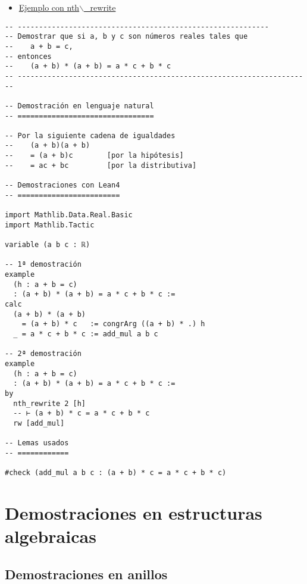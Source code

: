 \begin{itemize}
\item \href{./src/Basicos/Ejemplo\_con\_nth\_rewrite.lean}{Ejemplo con nth$\backslash$\_rewrite}
\end{itemize}
\begin{verbatim}
-- -----------------------------------------------------------
-- Demostrar que si a, b y c son números reales tales que
--    a + b = c,
-- entonces
--    (a + b) * (a + b) = a * c + b * c
-- ---------------------------------------------------------------------

-- Demostración en lenguaje natural
-- ================================

-- Por la siguiente cadena de igualdades
--    (a + b)(a + b)
--    = (a + b)c        [por la hipótesis]
--    = ac + bc         [por la distributiva]

-- Demostraciones con Lean4
-- ========================

import Mathlib.Data.Real.Basic
import Mathlib.Tactic

variable (a b c : ℝ)

-- 1ª demostración
example
  (h : a + b = c)
  : (a + b) * (a + b) = a * c + b * c :=
calc
  (a + b) * (a + b)
    = (a + b) * c   := congrArg ((a + b) * .) h
  _ = a * c + b * c := add_mul a b c

-- 2ª demostración
example
  (h : a + b = c)
  : (a + b) * (a + b) = a * c + b * c :=
by
  nth_rewrite 2 [h]
  -- ⊢ (a + b) * c = a * c + b * c
  rw [add_mul]

-- Lemas usados
-- ============

#check (add_mul a b c : (a + b) * c = a * c + b * c)
\end{verbatim}

\section{Demostraciones en estructuras algebraicas}
\label{sec:org6b4df1d}

\subsection{Demostraciones en anillos}
\label{sec:org941a92b}


